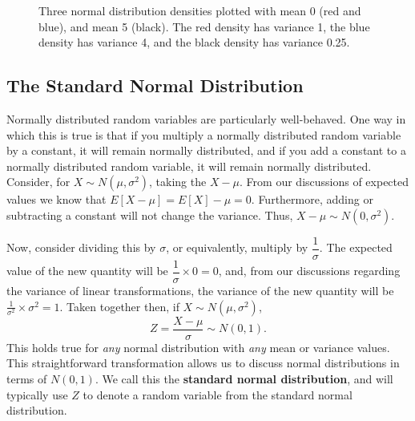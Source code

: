 \documentclass[
  letterpaper,
  DIV=11,
  numbers=noendperiod]{scrreprt}
\theoremstyle{definition}
\theoremstyle{definition}
\theoremstyle{definition}
\theoremstyle{remark}
\begin{document}
\begin{figure}[H]

\caption{\label{fig-normal-density}Three normal distribution densities
plotted with mean 0 (red and blue), and mean 5 (black). The red density
has variance 1, the blue density has variance 4, and the black density
has variance 0.25.}


\end{figure}%

\subsection{The Standard Normal
Distribution}\label{the-standard-normal-distribution}

Normally distributed random variables are particularly well-behaved. One
way in which this is true is that if you multiply a normally distributed
random variable by a constant, it will remain normally distributed, and
if you add a constant to a normally distributed random variable, it will
remain normally distributed. Consider, for \(X\sim N(\mu,\sigma^2)\),
taking the \(X - \mu\). From our discussions of expected values we know
that \(E[X-\mu] = E[X]-\mu = 0\). Furthermore, adding or subtracting a
constant will not change the variance. Thus,
\(X-\mu\sim N(0,\sigma^2)\).

Now, consider dividing this by \(\sigma\), or equivalently, multiply by
\(\dfrac{1}{\sigma}\). The expected value of the new quantity will be
\(\dfrac{1}{\sigma}\times 0 = 0\), and, from our discussions regarding
the variance of linear transformations, the variance of the new quantity
will be \(\frac{1}{\sigma^2}\times\sigma^2 = 1\). Taken together then,
if \(X\sim N(\mu,\sigma^2)\),
\[Z = \frac{X - \mu}{\sigma} \sim N(0,1).\] This holds true for
\emph{any} normal distribution with \emph{any} mean or variance values.
This straightforward transformation allows us to discuss normal
distributions in terms of \(N(0,1)\). We call this the \textbf{standard
normal distribution}, and will typically use \(Z\) to denote a random
variable from the standard normal distribution.
\end{document}
